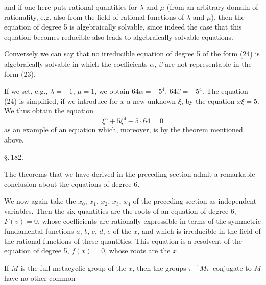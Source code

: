 
and if one here puts rational quantities for $\lambda$ and $\mu$ (from
an arbitrary domain of rationality, e.g. also from the field
of rational functions of $\lambda$ and $\mu$), then the equation
of degree 5
is algebraically solvable, since indeed the case that this equation
becomes reducible also leads to algebraically solvable equations.

Conversely we can say that no irreducible equation
of degree 5 of the form (24) is algebraically solvable in
which the coefficients $\alpha$, $\beta$ are not representable in the form (23).

If we set, e.g., $\lambda=-1$, $\mu=1$, we obtain $64\alpha=-5^4$,
$64\beta=-5^4$. The equation (24) is simplified, if we introduce for
$x$ a new unknown $\xi$, by the equation $x\xi=5$.
We thus obtain the equation
\[
\xi^5+5\xi^4-5\cdot 64=0
\]
as an example of an  equation which, moreover,
is  by the theorem mentioned above.

\begin{center}
\S.\,182.

\end{center}

The theorems that we have derived in the preceding section
admit a remarkable conclusion about the equations
of degree 6.

We now again take the $x_0$, $x_1$, $x_2$, $x_3$, $x_4$ of the preceding
section as independent variables. Then the six
quantities
are the roots of an equation of degree 6, $F(v)=0$, whose
coefficients are rationally expressible in terms of the symmetric fundamental functions
$a$, $b$, $c$, $d$, $e$ of the $x$, and which is irreducible in the field
of the rational functions of these quantities. This
equation is a resolvent of the equation of degree 5, $f(x)=0$,
whose roots are the $x$.

If $M$ is the full metacyclic group of the $x$, then the
groups $\pi^{-1}M\pi$ conjugate to $M$ have no other common
